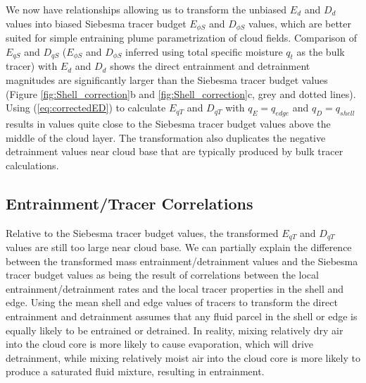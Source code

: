 \documentclass[12pt]{article}
\begin{document}
We now have relationships allowing us to transform the unbiased
$E_{d}$ and $D_{d}$ values into biased Siebesma tracer budget
$E_{\phi S}$ and $D_{\phi S}$ values, which are better suited for
simple entraining plume parametrization of cloud fields.
Comparison of $E_{q S}$ and $D_{q S}$ ($E_{\phi S}$ and $D_{\phi S}$ inferred
using total specific moisture $q_t$ as the bulk tracer) with $E_d$ and $D_d$
shows the direct entrainment and detrainment magnitudes are significantly larger 
than the Siebesma tracer budget values (Figure \ref{fig:Shell_correction}b 
and \ref{fig:Shell_correction}c, grey and dotted lines).  
Using  (\ref{eq:correctedED}) to calculate $E_{q T}$ and $D_{q T}$ with
$q_E = q_{edge}$ and $q_D = q_{shell}$ results in values quite close to 
the Siebesma tracer budget values above the middle of the cloud layer.   
The transformation also duplicates the negative 
detrainment values near cloud base that are typically produced by bulk tracer
calculations.


\subsection{Entrainment/Tracer Correlations}

Relative to the Siebesma tracer budget
values, the transformed $E_{q T}$ and $D_{q T}$ values are still too large 
near cloud base. 
We can partially explain the difference between the transformed mass 
entrainment/detrainment values and the Siebesma tracer budget values as 
being the result of correlations between the local entrainment/detrainment 
rates and the local tracer properties in the shell and edge.  Using the 
mean shell and edge values of tracers to transform the direct entrainment 
and detrainment assumes that any fluid parcel in the shell or edge is 
equally likely to be entrained or detrained.  In reality, mixing relatively 
dry air into the cloud core is more likely to cause evaporation, which will 
drive detrainment, while mixing relatively moist air into the cloud core is 
more likely to produce a saturated fluid mixture, resulting in entrainment.
\end{document}
